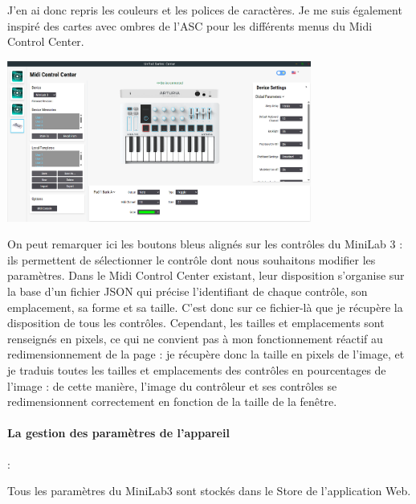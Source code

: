 \documentclass[francais]{rapportPFE}  %
\begin{document}
J'en ai donc repris les couleurs et les polices de caractères. Je me suis également inspiré des cartes avec ombres de l'ASC pour les différents menus du Midi Control Center.

\begin{center}
    \centering
    \includegraphics[width=10cm]{graphics/mcc_new.png}
    \label{fig:test1}
\end{center}

On peut remarquer ici les boutons bleus alignés sur les contrôles du MiniLab 3 : ils permettent de sélectionner le contrôle dont nous souhaitons modifier les paramètres. Dans le Midi Control Center existant, leur disposition s'organise sur la base d'un fichier JSON qui précise l'identifiant de chaque contrôle, son emplacement, sa forme et sa taille. C'est donc sur ce fichier-là que je récupère la disposition de tous les contrôles. Cependant, les tailles et emplacements sont renseignés en pixels, ce qui ne convient pas à mon fonctionnement réactif au redimensionnement de la page : je récupère donc la taille en pixels de l'image, et je traduis toutes les tailles et emplacements des contrôles en pourcentages de l'image : de cette manière, l'image du contrôleur et ses contrôles se redimensionnent correctement en fonction de la taille de la fenêtre.



\paragraph{La gestion des paramètres de l'appareil}:

Tous les paramètres du MiniLab3 sont stockés dans le Store de l'application Web.
\end{document}
